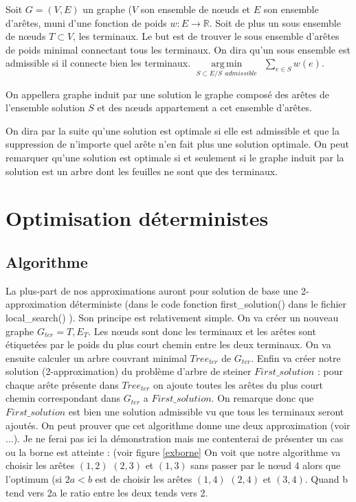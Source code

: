 \documentclass[10pt,a4paper]{article}
\DeclareMathOperator*{\argmin}{arg\,min}
\begin{document}
Soit $G = (V,E)$ un graphe ($V$ son ensemble de nœuds et $E$ son ensemble d'arêtes, muni d'une fonction de poids $w:E\rightarrow \mathbb{R}$. Soit de plus un sous ensemble de nœuds $T \subset V$, les terminaux. Le but est de trouver le sous ensemble d'arêtes de poids minimal connectant tous les terminaux. On dira qu'un sous ensemble est admissible si il connecte bien les terminaux.  $\argmin\limits_{S\subset E / S ~~admissible} ~~ \sum\limits_{e\in S} w(e) $. 

On appellera graphe induit par une solution le graphe composé des arêtes de l'ensemble solution $S$ et des nœuds appartement a cet ensemble d'arêtes. 

On dira par la suite qu'une solution est optimale si elle est admissible et que la suppression de n'importe quel arête n'en fait plus une solution optimale. On peut remarquer qu'une solution est optimale si et seulement si le graphe induit par la solution est un arbre dont les feuilles ne sont que des terminaux. 

\section{Optimisation déterministes}

\subsection{Algorithme}
La plus-part de nos approximations auront pour solution de base une 2-approximation déterministe (dans le code fonction first\_solution() dans le fichier local\_search() ).
Son principe est relativement simple. On va créer un nouveau graphe $G_{ter} = {T, E_T}$. Les nœuds sont donc les terminaux et les arêtes sont étiquetées par le poids du plus court chemin entre les deux terminaux. On va ensuite calculer un arbre couvrant minimal $Tree_{ter}$ de $G_{ter}$. Enfin va créer notre solution (2-approximation) du problème d'arbre de steiner $First\_solution$ :  pour chaque arête présente dans $Tree_{ter}$ on ajoute toutes les arêtes du plus court chemin correspondant dans $G_{ter} $ a $First\_solution$. On remarque donc que $First\_solution$ est bien une solution admissible vu que tous les terminaux seront ajoutés. On peut prouver que cet algorithme donne une deux approximation (voir ...). Je ne ferai pas ici la démonstration mais me contenterai de présenter un cas ou la borne est atteinte : (voir figure \ref{exborne} On voit que notre algorithme va choisir les arêtes $(1,2)$ $(2,3)$ et $(1,3)$ sans passer par le nœud $4$ alors que l'optimum (si $2a<b$ est de choisir les arêtes $(1,4)$ $(2,4)$ et $(3,4)$. Quand b tend vers 2a le ratio entre les deux tends vers 2.
\end{document}
